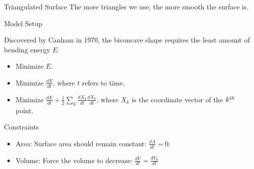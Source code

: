 \documentclass[10pt]{beamer}
\newcommand\nth{\textsuperscript{th}\xspace}
\begin{document}
\begin{frame}{Triangulated Surface}
The more triangles we use, the more smooth the surface is.
\end{frame}

\begin{frame}{Model Setup}


Discovered by Canham in 1970, the biconcave shape requires the least amount of bending energy $E$.
\begin{itemize}
\item Minimize $E$.
\item Minimize $\frac{dE}{dt}$, where $t$ refers to time.

\item Minimize $\frac{dE}{dt} +\frac{1}{2}\sum_{k} \frac{dX_{k}}{dt} \frac{dX_{k}}{dt}$, where $X_{k}$ is the coordinate vector of the $k\nth$ point.
\end{itemize}

\end{frame}

\begin{frame}{Constraints}

\begin{itemize}

\item Area: Surface area should remain constant: $\frac{dA}{dt} = 0$.

\vspace{5mm}

\item Volume: Force the volume to decrease: $\frac{dV}{dt} = \frac{dV_{0}}{dt}$

\end{itemize}

\end{frame}
\end{document}
